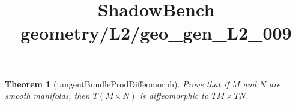\documentclass{article}
\title{ShadowBench geometry/L2/geo\_gen\_L2\_009}
\newtheorem{theorem}{Theorem}
\begin{document}
\maketitle

\begin{theorem}[tangentBundleProdDiffeomorph]
Prove that if $M$ and $N$ are smooth manifolds, then $T(M \times N)$ is diffeomorphic to $TM \times TN$.
\end{theorem}
\end{document}
